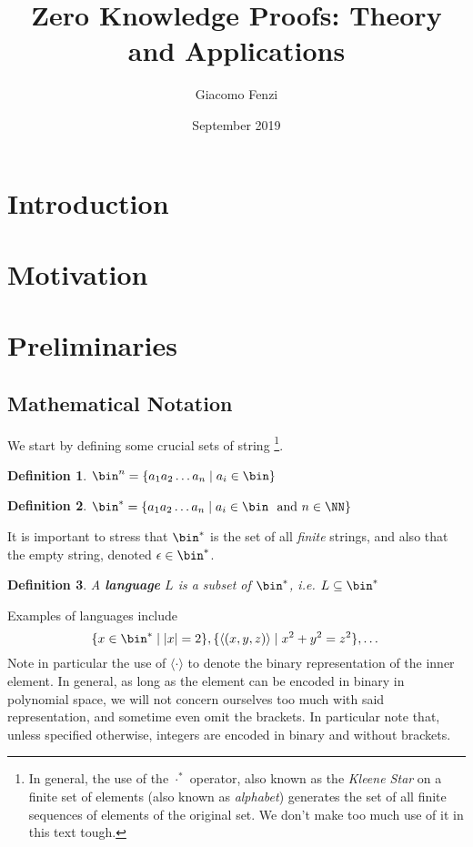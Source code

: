 \documentclass{article}
\title{Zero Knowledge Proofs: Theory and Applications}
\author{Giacomo Fenzi}
\date{September 2019}
\newtheorem{definition}{Definition}
\begin{document}
\maketitle

\begin{abstract}
\end{abstract}

\tableofcontents

\section{Introduction}


\section{Motivation}


\section{Preliminaries}
\subsection{Mathematical Notation}
We start by defining some crucial sets of string \footnote{In general, the use of the $\cdot ^ *$ operator, also known as the \textit{Kleene Star} on a finite set of elements (also known as \textit{alphabet}) generates the set of all finite sequences of elements of the original set. We don't make too much use of it in this text tough.}.
\begin{definition}
$\bin^n = \{ a_1 a_2 \dots a_n \mid a_i \in \bin\}$
\end{definition}
\begin{definition}
$\bin^* = \{ a_1 a_2 \dots a_n \mid a_i \in \bin \text{ \normalfont{ and }} n \in \NN \}$
\end{definition}

It is important to stress that $\bin^*$ is the set of all \textit{finite} strings, and also that the empty string, denoted $\epsilon \in \bin^*$.

\begin{definition}
A \textbf{language} $L$ is a subset of $\bin^*$, i.e. $L \subseteq \bin^*$
\end{definition}

Examples of languages include 
\[ \{ x \in \bin^* \mid |x| = 2 \}, \{ \langle(x, y, z)\rangle \mid x^2 + y^2 = z^2 \}, \dots \]
Note in particular the use of $\langle \cdot \rangle$ to denote the binary representation of the inner element. In general, as long as the element can be encoded in binary in polynomial space, we will not concern ourselves too much with said representation, and sometime even omit the brackets. In particular note that, unless specified otherwise, integers are encoded in binary and without brackets.  \par
\end{document}
